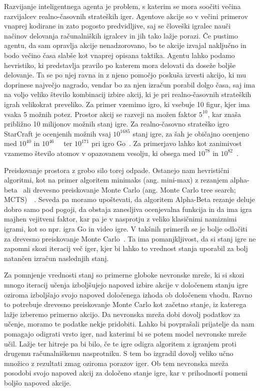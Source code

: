 \documentclass[a4paper, 12pt]{book}
\begin{document}
Razvijanje inteligentnega agenta je problem, s katerim se mora soočiti večina razvijalcev realno-časovnih strateških iger. 
Agentove akcije so v večini primerov vnaprej kodirane in zato pogosto predvidljive, saj se človeški igralec nauči načinov delovanja računalniških igralcev in jih tako lažje porazi.
Če pustimo agentu, da sam opravlja akcije nenadzorovano, bo te akcije izvajal naključno in bodo večino časa slabše kot vnaprej opisana taktika.
Agentu lahko podamo hevristiko, ki predstavlja pravilo po katerem mora delovati da doseže boljše delovanje.
Ta se po njej ravna in z njeno pomočjo poskuša izvesti akcijo, ki mu doprinese največjo nagrado, vendar bo za njen izračun porabil dolgo časa, saj ima na voljo veliko število kombinacij izbire akcij, ki je pri realno-časovnih strateških igrah velikokrat preveliko.
Za primer vzemimo igro, ki vsebuje 10 figur, kjer ima vsaka 5 možnih potez.
Prostor akcij se razveji na možen faktor $5^{10}$, kar znaša približno 10 milijonov možnih stanj igre.
Za realno-časovno strateško igro StarCraft je ocenjenih možnih vsaj $10^{1685}$ stanj igre, za šah je običajno ocenjeno med $10^{40}$ in $10^{46}$~{\cite{chinchalkar1996upper}}~{\cite{steinerberger2015number}} ter $10^{171}$ pri igro Go~\cite{ontanon2017combinatorial}.
Za primerjavo lahko kot zanimivost vzamemo število atomov v opazovanem vesolju, ki obsega med $10^{78}$ in $10^{82}$~\cite{atoms}.

Preiskovanje prostora z grobo silo torej odpade. 
Ostanejo nam hevristični algoritmi, kot na primer algoritem minimaks (ang. mini-max) z rezanjem alpha-beta~{\cite{knuth1975analysis}} ali drevesno preiskovanje Monte Carlo (ang. Monte Carlo tree search; MCTS)~{\cite{kocsis2006bandit}}~{\cite{coulom2006efficient}}. 
Seveda pa moramo upoštevati, da algoritem Alpha-Beta rezanje deluje dobro samo pod pogoji, da obstaja zanesljiva ocenjevalna funkcija in da ima igra majhen vejitveni faktor, kar pa je v nasprotju z veliko klasičnimi namiznimi igrami, kot so npr. igra Go in video igre. 
V takšnih primerih se je bolje odločiti za drevesno preiskovanje Monte Carlo~\cite{chaslot2008monte}.
Ta ima pomanjkljivost, da si stanj igre ne zapomni skozi iteracij več iger, kjer bi lahko to vrednost stanja uporabil za bolj natančen izračun naslednjih stanj.

Za pomnjenje vrednosti stanj so primerne globoke nevronske mreže, ki si skozi mnogo iteracij učenja izboljšujejo napoved izbire akcije v določenem stanju igre oziroma izboljšajo svojo napoved določenega izhoda ob določenem vhodu.
Ravno to potrebuje drevesno preiskovanje Monte Carlo kot začetno stanje, iz katerega lažje izberemo primerno akcijo.
Da nevronska mreža dobi dovolj podatkov za učenje, moramo te podatke nekje pridobiti.
Lahko bi povprašali prijatelje da nam pomagajo odigrati vrsto iger, nad katerimi bi se potem model nevronske mreže učil.
Lažje ter hitreje pa bi bilo, če te igre odigra algoritem z igranjem proti drugemu računalniškemu nasprotniku.
S tem bo izgradil dovolj veliko učno množico z rezultati zmag oziroma porazov iger. 
Ob tem nevronska mreža posodobi svojo napoved akcij za določeno stanje igre, kar v prihodnosti pomeni boljšo napoved akcije.
\end{document}
